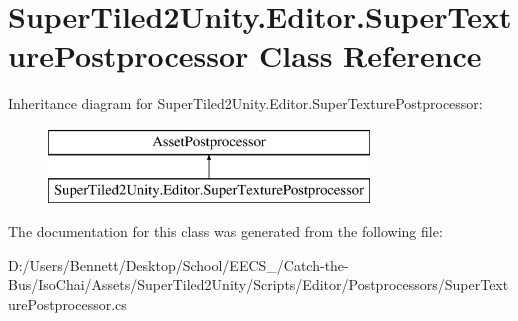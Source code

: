 \hypertarget{class_super_tiled2_unity_1_1_editor_1_1_super_texture_postprocessor}{}\section{Super\+Tiled2\+Unity.\+Editor.\+Super\+Texture\+Postprocessor Class Reference}
\label{class_super_tiled2_unity_1_1_editor_1_1_super_texture_postprocessor}
Inheritance diagram for Super\+Tiled2\+Unity.\+Editor.\+Super\+Texture\+Postprocessor\+:\begin{figure}[H]
\begin{center}
\leavevmode
\includegraphics[height=2.000000cm]{class_super_tiled2_unity_1_1_editor_1_1_super_texture_postprocessor}
\end{center}
\end{figure}


The documentation for this class was generated from the following file\+:\begin{DoxyCompactItemize}
\item 
D\+:/\+Users/\+Bennett/\+Desktop/\+School/\+E\+E\+C\+S\+\_/\+Catch-\/the-\/\+Bus/\+Iso\+Chai/\+Assets/\+Super\+Tiled2\+Unity/\+Scripts/\+Editor/\+Postprocessors/Super\+Texture\+Postprocessor.\+cs\end{DoxyCompactItemize}
